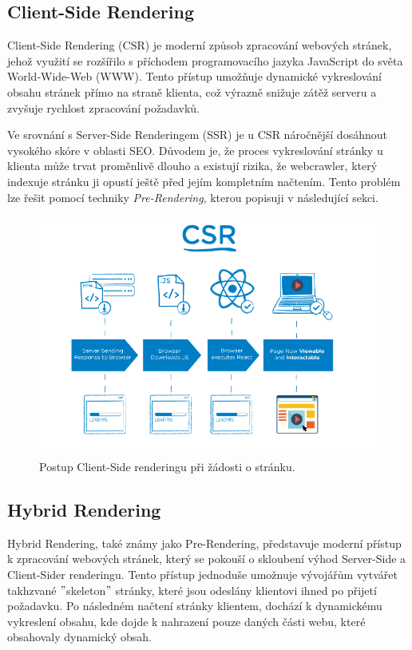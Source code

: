\subsection{Client-Side Rendering}
\label{subsec:dev-request-processing-client-side-rendering}
Client-Side Rendering (CSR) je moderní způsob zpracování webových stránek, jehož využití se rozšířilo s příchodem programovacího jazyka JavaScript do světa World-Wide-Web (WWW). Tento přístup umožňuje dynamické vykreslování obsahu stránek přímo na straně klienta, což výrazně snižuje zátěž serveru a zvyšuje rychlost zpracování požadavků.

Ve srovnání s Server-Side Renderingem (SSR) je u CSR náročnější dosáhnout vysokého skóre v oblasti SEO. Důvodem je, že proces vykreslování stránky u klienta může trvat proměnlivě dlouho a existují rizika, že webcrawler, který indexuje stránku ji opustí ještě před jejím kompletním načtením. Tento problém lze řešit pomocí techniky \textit{Pre-Rendering}, kterou popisuji v následující sekci.

\begin{figure}[H]
    \centering
    \includegraphics[width=1.0\textwidth]{figures/client-side-rendering}
    \caption{Postup Client-Side renderingu při žádosti o stránku. \cite{rendering-diff}}
    \label{fig:client-side-rendering}
\end{figure}

\subsection{Hybrid Rendering}
\label{subsec:dev-request-processing-hybrid-rendering}
Hybrid Rendering, také známy jako Pre-Rendering, představuje moderní přístup k zpracování webových stránek, který se pokouší o skloubení výhod Server-Side a Client-Sider renderingu. Tento přístup jednoduše umožnuje vývojářům vytvářet takhzvané \("\)skeleton\("\) stránky, které jsou odeslány klientovi ihned po přijetí požadavku. Po následném načtení stránky klientem, dochází k dynamickému vykreslení obsahu, kde dojde k nahrazení pouze daných části webu, které obsahovaly dynamický obsah.

